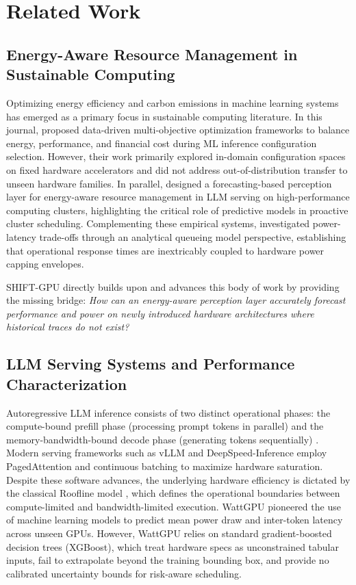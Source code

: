\documentclass[3p,12pt]{elsarticle}
\begin{document}
\section{Related Work}
\label{sec:related}

\subsection{Energy-Aware Resource Management in Sustainable Computing}
Optimizing energy efficiency and carbon emissions in machine learning systems has emerged as a primary focus in sustainable computing literature. In this journal, \citet{suscom_multiobj2026} proposed data-driven multi-objective optimization frameworks to balance energy, performance, and financial cost during ML inference configuration selection. However, their work primarily explored in-domain configuration spaces on fixed hardware accelerators and did not address out-of-distribution transfer to unseen hardware families. In parallel, \citet{suscom_forecasting2026} designed a forecasting-based perception layer for energy-aware resource management in LLM serving on high-performance computing clusters, highlighting the critical role of predictive models in proactive cluster scheduling. Complementing these empirical systems, \citet{suscom_tradeoffs2025} investigated power-latency trade-offs through an analytical queueing model perspective, establishing that operational response times are inextricably coupled to hardware power capping envelopes.

SHIFT-GPU directly builds upon and advances this body of work by providing the missing bridge: \textit{How can an energy-aware perception layer accurately forecast performance and power on newly introduced hardware architectures where historical traces do not exist?}

\subsection{LLM Serving Systems and Performance Characterization}
Autoregressive LLM inference consists of two distinct operational phases: the compute-bound prefill phase (processing prompt tokens in parallel) and the memory-bandwidth-bound decode phase (generating tokens sequentially) \citep{kwon2023vllm}. Modern serving frameworks such as vLLM \citep{kwon2023vllm} and DeepSpeed-Inference \citep{dao2022flashattention} employ PagedAttention and continuous batching to maximize hardware saturation. Despite these software advances, the underlying hardware efficiency is dictated by the classical Roofline model \citep{williams2009roofline}, which defines the operational boundaries between compute-limited and bandwidth-limited execution. WattGPU \citep{fadel2026wattgpu} pioneered the use of machine learning models to predict mean power draw and inter-token latency across unseen GPUs. However, WattGPU relies on standard gradient-boosted decision trees (XGBoost), which treat hardware specs as unconstrained tabular inputs, fail to extrapolate beyond the training bounding box, and provide no calibrated uncertainty bounds for risk-aware scheduling.
\end{document}
